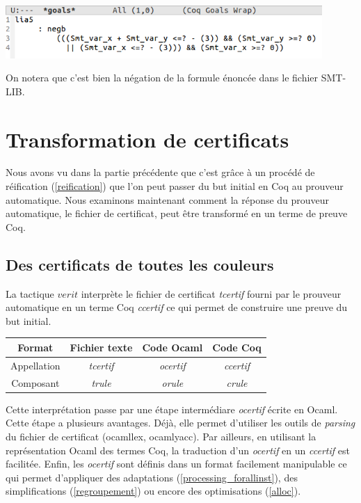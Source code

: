 \documentclass[11pt]{article}
\begin{document}
\includegraphics[height=2cm]{checklia5.png}

On notera que c'est bien la négation de la formule énoncée dans le fichier SMT-LIB. 


\newpage
\section{Transformation de certificats}

Nous avons vu dans la partie précédente que c'est grâce à un procédé de réification (\ref{reification}) que l'on peut passer du but initial en Coq au prouveur automatique. Nous examinons maintenant comment la réponse du prouveur automatique, le fichier de certificat, peut être transformé en un terme de preuve Coq.

\subsection{Des certificats de toutes les couleurs}

La tactique $verit$ interprète le fichier de certificat \textit{tcertif} fourni par le prouveur automatique en un terme Coq \textit{ccertif} ce qui permet de construire une preuve du but initial. \\

\begin{center}
\begin{tabular}{ |c||c|c|c| } 
 \hline
 Format & Fichier texte & Code Ocaml & Code Coq \\ 
 \hline
 Appellation & \textit{tcertif} & \textit{ocertif} & \textit{ccertif} \\ 
 \hline
 Composant & \textit{trule} & \textit{orule} & \textit{crule} \\ 
 \hline
\end{tabular}
\end{center}

Cette interprétation passe par une étape intermédiare \textit{ocertif} écrite en Ocaml. Cette étape a plusieurs avantages. Déjà, elle permet d'utiliser les outils de \textit{parsing} du fichier de certificat (ocamllex, ocamlyacc). Par ailleurs, en utilisant la représentation Ocaml des termes Coq, la traduction d'un \textit{ocertif} en un \textit{ccertif} est facilitée. Enfin, les \textit{ocertif} sont définis dans un format facilement manipulable ce qui permet d'appliquer des adaptations (\ref{processing_forallinst}), des simplifications (\ref{regroupement}) ou encore des optimisations (\ref{alloc}).
\end{document}
